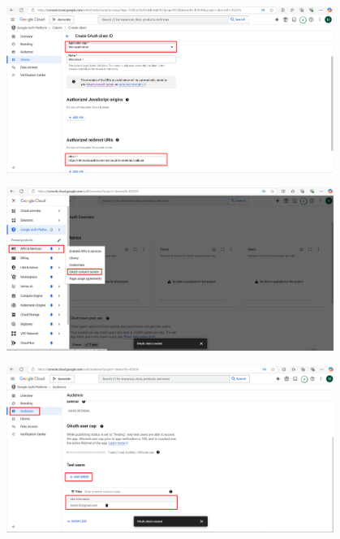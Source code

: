 \begin{itemize}[label=]
\begin{figure}[H]
    \end{figure}
    \begin{figure}[H]
    \centering
    \includegraphics[width=0.95\textwidth]{images/GGcloud-12.png}
    
    \end{figure}

    \begin{figure}[H]
    \centering
    \includegraphics[width=0.95\textwidth]{images/GGcloud-14.png}
    
    \end{figure}
    \begin{figure}[H]
    \centering
    \includegraphics[width=0.95\textwidth]{images/GGcloud-15.png}
    

\end{figure}
\end{itemize}
